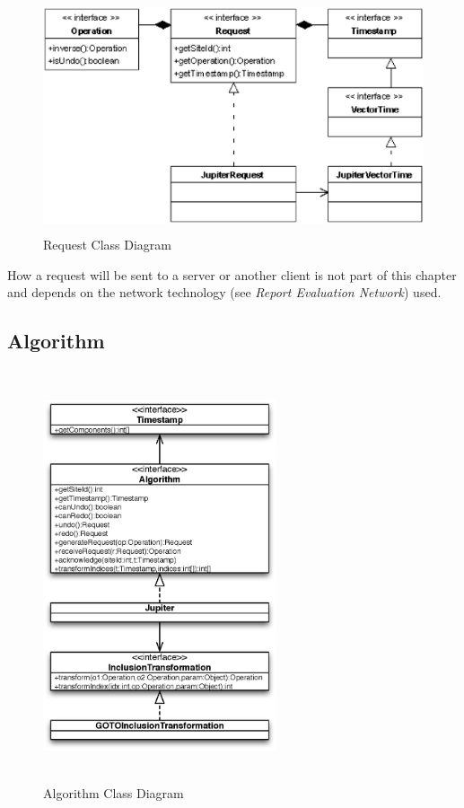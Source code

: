\begin{figure}[H]
\centering
\includegraphics[height=6.87cm,width=12.09cm]{../images/finalreport/algorithm_request.eps}
\caption{Request Class Diagram}
\label{Request Class Diagram}
\end{figure}

How a request will be sent to a server or another client is not part of this chapter and depends on the network technology (see \emph{Report Evaluation Network}) used.


\subsection{Algorithm}

\begin{figure}[H]
\centering
\includegraphics[height=12.09cm,width=6.87cm]{../images/finalreport/algorithm.eps}
\caption{Algorithm Class Diagram}
\label{fig:algorithm.uml}
\end{figure}

